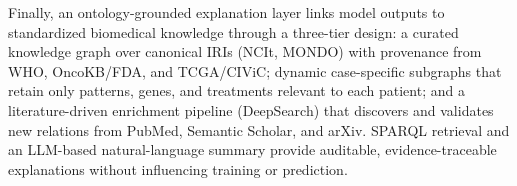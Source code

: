 Finally, an ontology-grounded explanation layer links model outputs to standardized biomedical knowledge through a three-tier design: a curated knowledge graph over canonical IRIs (NCIt, MONDO) with provenance from WHO, OncoKB/FDA, and TCGA/CIViC; dynamic case-specific subgraphs that retain only patterns, genes, and treatments relevant to each patient; and a literature-driven enrichment pipeline (DeepSearch) that discovers and validates new relations from PubMed, Semantic Scholar, and arXiv. SPARQL retrieval and an LLM-based natural-language summary provide auditable, evidence-traceable explanations without influencing training or prediction.
